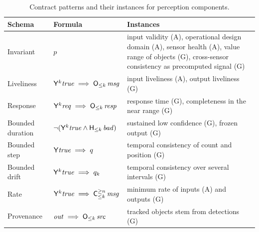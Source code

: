 \begin{table}[t]
  \caption{Contract patterns and their instances for perception components.}
  \label{tab:patterns}
  \centering
  \small
  \begin{tabular}{@{}llp{5.5cm}@{}}
    \toprule
    Schema & Formula & Instances\\
    \midrule
    Invariant & $p$ &
      input validity (A), operational design domain (A), sensor
      health (A), value range of objects (G), cross-sensor consistency
      as precomputed signal (G)\\
    Liveliness & $\Yop^k\true \implies \Owin{k}\,\mathit{msg}$ &
      input liveliness (A), output liveliness (G)\\
    Response & $\Yop^k\mathit{req} \implies \Owin{k}\,\mathit{resp}$ &
      response time (G), completeness in the near range (G)\\
    Bounded duration &
      $\lnot(\Yop^k\true \land \Hwin{k}\,\mathit{bad})$ &
      sustained low confidence (G), frozen output (G)\\
    Bounded step & $\Yop\true \implies q$ &
      temporal consistency of count and position (G)\\
    Bounded drift & $\Yop^k\true \implies q_k$ &
      temporal consistency over several intervals (G)\\
    Rate & $\Yop^k\true \implies \Cwin{k}{n}\,\mathit{msg}$ &
      minimum rate of inputs (A) and outputs (G)\\
    Provenance & $\mathit{out} \implies \Owin{k}\,\mathit{src}$ &
      tracked objects stem from detections (G)\\
    \bottomrule
  \end{tabular}
\end{table}


